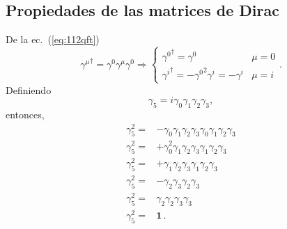 \subsection{Propiedades de las matrices de Dirac}
\label{sec:propiedades-de-las}
De la ec.~(\ref{eq:112qft})
\begin{equation}
  {\gamma^\mu}^\dagger=\gamma^0\gamma^\mu\gamma^0\Rightarrow  
  \begin{cases}
    {\gamma^0}^\dagger=\gamma^0&\mu=0\\
    {\gamma^i}^\dagger=-{\gamma^0}^2\gamma^i=-\gamma^i&\mu=i
  \end{cases}.
\end{equation}
Definiendo
\begin{equation}
\label{eq:117qft}
  \gamma_5=i\gamma_0\gamma_1\gamma_2\gamma_3,
\end{equation}
entonces,
\begin{align}
  \gamma_5^2=&-\gamma_0\gamma_1\gamma_2\gamma_3\gamma_0\gamma_1\gamma_2\gamma_3\nonumber\\
  \gamma_5^2=&+\gamma_0^2\gamma_1\gamma_2\gamma_3\gamma_1\gamma_2\gamma_3\nonumber\\
  \gamma_5^2=&+\gamma_1\gamma_2\gamma_3\gamma_1\gamma_2\gamma_3\nonumber\\
  \gamma_5^2=&-\gamma_2\gamma_3\gamma_2\gamma_3\nonumber\\
  \gamma_5^2=&\gamma_2\gamma_2\gamma_3\gamma_3\nonumber\\
  \gamma_5^2=&\mathbf{1}\,.
\end{align}


